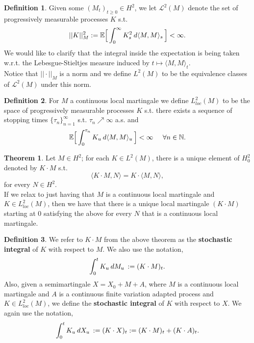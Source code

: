\documentclass[12pt]{article}
\newcommand{\cL}{\mathcal{L}}
\newcommand{\E}{\mathbb{E}}
\newcommand{\N}{\mathbb{N}}
\newcommand{\df}[1]{\hspace{2 px} d #1 \hspace{2 px}}
\newcommand{\spc}{\hspace{7 px}}
\newcommand{\la}{\langle}
\newcommand{\ra}{\rangle}
\newcommand{\norm}[2]{||#1||_{#2}}
\theoremstyle{definition}
\newtheorem{defn}{Definition}
\newtheorem{thm}{Theorem}
\begin{document}
\begin{defn}
    Given some $(M_t)_{t \geq 0} \in H^2$, we let $\cL^2(M)$ denote the set of progressively measurable processes $K$ s.t.
    \[
        \norm{K}{M}^2 := \E \Big [
            \int_0^\infty K_s^2 \df{\la M, M \ra_s}
        \Big ] < \infty.
    \]
    We would like to clarify that the integral inside the expectation is being taken w.r.t. the Lebesgue-Stieltjes measure induced by $t \mapsto \la M, M \ra_t$. \\
    Notice that $\norm{\cdot}{M}$ is a norm and we define $L^2(M)$ to be the equivalence classes of $\cL^2(M)$ under this norm. \\
\end{defn}

\begin{defn}
    For $M$ a continuous local martingale we define $L^2_{loc}(M)$ to be the space of progressively measurable processes $K$ s.t.
    there exists a sequence of stopping times $\{\tau_n\}_{n=1}^\infty$ s.t. $\tau_n \nearrow \infty$ a.s. and
    \[
        \E \Big [
            \int_0^{\tau_n} K_u \df{\la M, M \ra_u}
        \Big ] < \infty \spc \spc \forall n \in \N.
    \]
\end{defn}

\begin{thm} \cite{revuz1990} %
    Let $M \in H^2$; for each $K \in L^2(M)$, there is a unique element of $H_0^2$ denoted by $K \cdot M$ s.t. 
    \[
        \la K \cdot M, N \ra = K \cdot \la M, N \ra,
    \]
    for every $N \in H^2$. \\
    If we relax to just having that $M$ is a continuous local martingale and $K \in L^2_{loc}(M)$, then we have that there is a unique local martingale $(K \cdot M)$ starting at 0 satisfying the above for every $N$ that is a continuous local martingale.
\end{thm}

\begin{defn}
    We refer to $K \cdot M$ from the above theorem as the \textbf{stochastic integral} of $K$ with respect to $M$.
    We also use the notation,
    \[
        \int_0^t K_u \df{M_u} := (K \cdot M)_t.
    \]
    Also, given a semimartingale $X = X_0 + M + A$, where $M$ is a continuous local martingale and $A$ is a continuous finite variation adapted process and $K \in L^2_{loc}(M)$, we define the \textbf{stochastic integral} of $K$ with respect to $X$. We again use the notation,
    \[
        \int_0^t K_u \df{X_u} := (K \cdot X)_t := (K \cdot M)_t + (K \cdot A)_t.
    \]
\end{defn}
\end{document}
